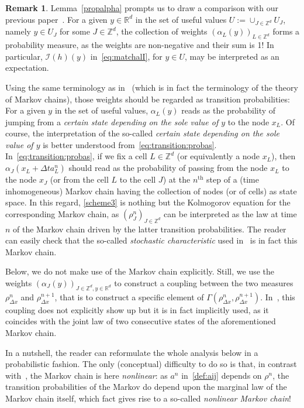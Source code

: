 \documentclass[11pt]{article}
\theoremstyle{definition}
\newtheorem{rema}[theo]{Remark}
\numberwithin{equation}{section}
\newcommand*\RR{\mathbb{R}}
\newcommand*\ZZ{\mathbb{Z}}
\begin{document}
\begin{rema}\label{comparison}
Lemma~\ref{propalpha} prompts us to draw a comparison with our previous paper~\cite{DLV}. For a given $y \in \RR^d$ in the set of useful values $U:=\cup_{J \in \ZZ^d} U_{J}$, namely $y \in U_{J}$ for some $J \in \ZZ^d$, the collection of weights $(\alpha_{L}(y))_{L \in \ZZ^d}$ forms a probability measure, as the weights are non-negative and their sum is 1! In particular, ${\mathcal I}(h)(y)$ in~\eqref{eq:matchalI}, for $y \in U$, may be interpreted as an expectation.

Using the same terminology as in~\cite{DLV} (which is in fact the terminology of the theory of Markov chains), those weights should be regarded as transition probabilities: For a given $y$ in the set of useful values, $\alpha_{L}(y)$ reads as the probability of jumping from a \emph{certain state depending on the sole value of $y$} to the node $x_{L}$. Of course, the interpretation of the so-called \emph{certain state depending on the sole value of $y$} is better understood from~\eqref{eq:transition:probas}. In~\eqref{eq:transition:probas}, if we fix a cell $L \in \ZZ^d$ (or equivalently a node $x_{L}$), then $\alpha_{J}(x_{L}+\Delta t a^n_{L})$ should read as the probability of passing from the node $x_{L}$ to the node $x_{J}$ (or from the cell $L$ to the cell $J$) at the $n^{\textrm{th}}$ step of a (time inhomogeneous) Markov chain having the collection of nodes (or of cells) as state space. In this regard, \eqref{scheme3} is nothing but the Kolmogorov equation for the corresponding Markov chain, as $(\rho^n_{J})_{J \in \ZZ^d}$ can be interpreted as the law at time $n$ of the Markov chain driven by the latter transition probabilities. The reader can easily check that the so-called \emph{stochastic characteristic} used in~\cite{DLV} is in fact this Markov chain.

Below, we do not make use of the Markov chain explicitly. Still, we use the weights $(\alpha_{J}(y))_{J \in \ZZ^d, y \in \RR^d}$ to construct a coupling between the two measures $\rho^n_{\Delta x}$ and $\rho^{n+1}_{\Delta x}$, that is to construct a specific element of $\Gamma(\rho^n_{\Delta x},\rho^{n+1}_{\Delta x})$. In~\cite{DLV}, this coupling does not explicitly show up but it is in fact implicitly used, as it coincides with the joint law of two consecutive states of the aforementioned Markov chain.

In a nutshell, the reader can reformulate the whole analysis below in a probabilistic fashion. The only (conceptual) difficulty to do so is that, in contrast with~\cite{DLV}, the Markov chain is here \emph{nonlinear}: as $a^n$ in~\eqref{def:aij} depends on $\rho^n$, the transition probabilities of the Markov do depend upon the marginal law of the Markov chain itself, which fact gives rise to a so-called \emph{nonlinear Markov chain}!
\end{rema}
\end{document}
